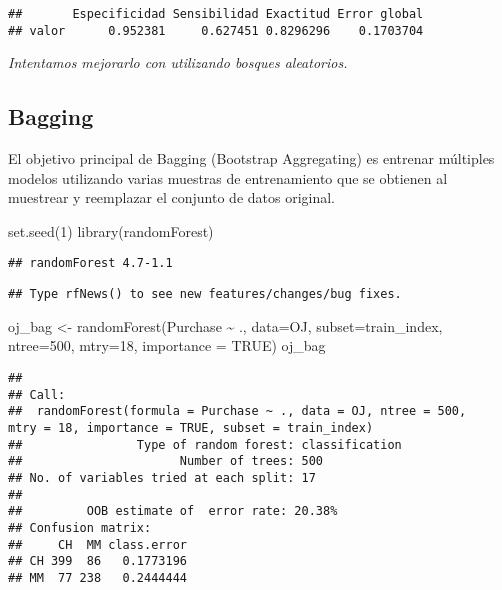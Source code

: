 \documentclass[
]{article}
\newenvironment{Shaded}{\begin{snugshade}}{\end{snugshade}}
\newcommand{\AttributeTok}[1]{\textcolor[rgb]{0.77,0.63,0.00}{#1}}
\newcommand{\ConstantTok}[1]{\textcolor[rgb]{0.00,0.00,0.00}{#1}}
\newcommand{\DecValTok}[1]{\textcolor[rgb]{0.00,0.00,0.81}{#1}}
\newcommand{\FunctionTok}[1]{\textcolor[rgb]{0.00,0.00,0.00}{#1}}
\newcommand{\NormalTok}[1]{#1}
\newcommand{\OtherTok}[1]{\textcolor[rgb]{0.56,0.35,0.01}{#1}}
\newcommand{\SpecialCharTok}[1]{\textcolor[rgb]{0.00,0.00,0.00}{#1}}
\begin{document}
\begin{verbatim}
##       Especificidad Sensibilidad Exactitud Error global
## valor      0.952381     0.627451 0.8296296    0.1703704
\end{verbatim}

\emph{Intentamos mejorarlo con utilizando bosques aleatorios.}

\hypertarget{bagging}{%
\subsection{Bagging}\label{bagging}}

El objetivo principal de Bagging (Bootstrap Aggregating) es entrenar
múltiples modelos utilizando varias muestras de entrenamiento que se
obtienen al muestrear y reemplazar el conjunto de datos original.

\begin{Shaded}
\begin{Highlighting}[]
\FunctionTok{set.seed}\NormalTok{(}\DecValTok{1}\NormalTok{)}
\FunctionTok{library}\NormalTok{(randomForest)}
\end{Highlighting}
\end{Shaded}

\begin{verbatim}
## randomForest 4.7-1.1
\end{verbatim}

\begin{verbatim}
## Type rfNews() to see new features/changes/bug fixes.
\end{verbatim}

\begin{Shaded}
\begin{Highlighting}[]
\NormalTok{oj\_bag }\OtherTok{\textless{}{-}} \FunctionTok{randomForest}\NormalTok{(Purchase }\SpecialCharTok{\textasciitilde{}}\NormalTok{ ., }\AttributeTok{data=}\NormalTok{OJ, }\AttributeTok{subset=}\NormalTok{train\_index, }\AttributeTok{ntree=}\DecValTok{500}\NormalTok{, }\AttributeTok{mtry=}\DecValTok{18}\NormalTok{, }\AttributeTok{importance =} \ConstantTok{TRUE}\NormalTok{)}
\NormalTok{oj\_bag}
\end{Highlighting}
\end{Shaded}

\begin{verbatim}
## 
## Call:
##  randomForest(formula = Purchase ~ ., data = OJ, ntree = 500,      mtry = 18, importance = TRUE, subset = train_index) 
##                Type of random forest: classification
##                      Number of trees: 500
## No. of variables tried at each split: 17
## 
##         OOB estimate of  error rate: 20.38%
## Confusion matrix:
##     CH  MM class.error
## CH 399  86   0.1773196
## MM  77 238   0.2444444
\end{verbatim}
\end{document}
